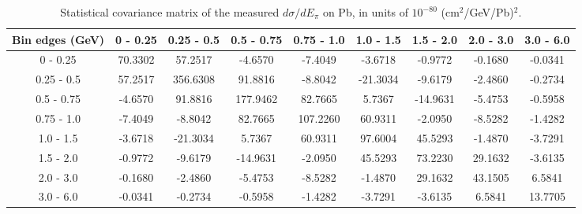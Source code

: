 \documentclass[aps,prl,twocolumn,superscriptaddress,nofootinbib]{revtex4-1}
\begin{document}
\begin{table}[h!]
  \centering
  \caption{Statistical covariance matrix of the measured $d\sigma/dE_{\pi}$ on Pb, in units of $10^{-80}$ (cm$^{2}$/GeV/Pb)$^{2}$.}
    \begin{tabular}{c||cccccccc}
      Bin edges (GeV) & 0 - 0.25 & 0.25 - 0.5 & 0.5 - 0.75 & 0.75 - 1.0 & 1.0 - 1.5 & 1.5 - 2.0 & 2.0 - 3.0 & 3.0 - 6.0 \\
\hline \hline
        0 - 0.25 & 70.3302 & 57.2517 & -4.6570 & -7.4049 & -3.6718 & -0.9772 & -0.1680 & -0.0341 \\
      0.25 - 0.5 & 57.2517 & 356.6308 & 91.8816 & -8.8042 & -21.3034 & -9.6179 & -2.4860 & -0.2734 \\
      0.5 - 0.75 & -4.6570 & 91.8816 & 177.9462 & 82.7665 &  5.7367 & -14.9631 & -5.4753 & -0.5958 \\
      0.75 - 1.0 & -7.4049 & -8.8042 & 82.7665 & 107.2260 & 60.9311 & -2.0950 & -8.5282 & -1.4282 \\
       1.0 - 1.5 & -3.6718 & -21.3034 &  5.7367 & 60.9311 & 97.6004 & 45.5293 & -1.4870 & -3.7291 \\
       1.5 - 2.0 & -0.9772 & -9.6179 & -14.9631 & -2.0950 & 45.5293 & 73.2230 & 29.1632 & -3.6135 \\
       2.0 - 3.0 & -0.1680 & -2.4860 & -5.4753 & -8.5282 & -1.4870 & 29.1632 & 43.1505 &  6.5841 \\
       3.0 - 6.0 & -0.0341 & -0.2734 & -0.5958 & -1.4282 & -3.7291 & -3.6135 &  6.5841 & 13.7705 \\
    \end{tabular}
  \label{tablecov:Pb_Statistical_Epi}
\end{table}
\end{document}
